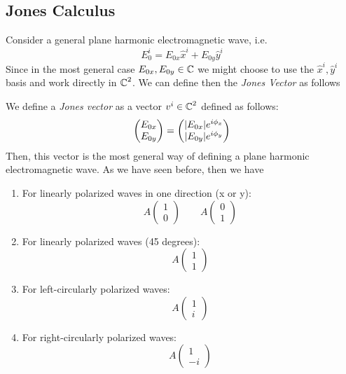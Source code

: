 \documentclass[../electromagnetism.tex]{subfiles}
\begin{document}
\subsection{Jones Calculus}
Consider a general plane harmonic electromagnetic wave, i.e.
\begin{equation}
	E_0^i=E_{0x}\hat{x}^i+E_{0y}\hat{y}^i
	\label{eq:generalplanewavejones}
\end{equation}
Since in the most general case $E_{0x},E_{0y}\in\operatorname{\mathbb{C}}$ we might choose to use the $\hat{x}^i,\hat{y}^i$ basis and work directly in $\operatorname{\mathbb{C}}^2$. We can define then the \textit{Jones Vector} as follows
\begin{dfn}
	We define a \textit{Jones vector} as a vector $v^i\in\operatorname{\mathbb{C}}^2$ defined as follows:
	\begin{equation}
		\begin{pmatrix}
			E_{0x}\\
			E_{0y}
		\end{pmatrix}=\begin{pmatrix}
			\abs{E_{0x}}e^{i\phi_x}\\
			\abs{E_{0y}}e^{i\phi_y}
		\end{pmatrix}
		\label{eq:jonesvector}
	\end{equation}
	Then, this vector is the most general way of defining a plane harmonic electromagnetic wave. As we have seen before, then we have
	\begin{enumerate}
	\item For linearly polarized waves in one direction (x or y):
		\begin{equation}
			A\begin{pmatrix}
				1\\0
			\end{pmatrix}\qquad A\begin{pmatrix}
				0\\1
			\end{pmatrix}
			\label{eq:linearpoljones}
		\end{equation}
	\item For linearly polarized waves (45 degrees):
		\begin{equation}
			A\begin{pmatrix}
				1\\1				
			\end{pmatrix}
			\label{eq:45poljones}
		\end{equation}
	\item For left-circularly polarized waves:
		\begin{equation}
			A\begin{pmatrix}
				1\\i
			\end{pmatrix}
			\label{eq:lcpjones}
		\end{equation}
	\item For right-circularly polarized waves:
		\begin{equation}
			A\begin{pmatrix}
				1\\-i
			\end{pmatrix}
			\label{eq:rcpjones}
		\end{equation}
	\end{enumerate}
\end{dfn}
\end{document}
